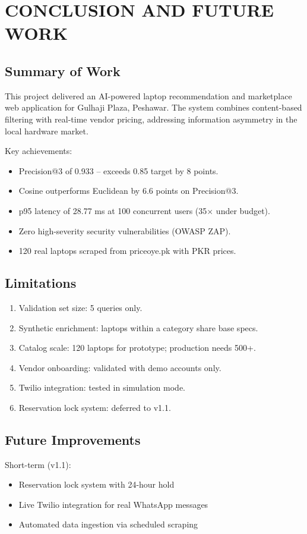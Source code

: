 \chapter{CONCLUSION AND FUTURE WORK}

\section{Summary of Work}
This project delivered an AI-powered laptop recommendation and marketplace web
application for Gulhaji Plaza, Peshawar. The system combines content-based
filtering with real-time vendor pricing, addressing information asymmetry in
the local hardware market.

Key achievements:
\begin{itemize}
  \item Precision@3 of 0.933 -- exceeds 0.85 target by 8 points.
  \item Cosine outperforms Euclidean by 6.6 points on Precision@3.
  \item p95 latency of 28.77 ms at 100 concurrent users (35$\times$ under budget).
  \item Zero high-severity security vulnerabilities (OWASP ZAP).
  \item 120 real laptops scraped from priceoye.pk with PKR prices.
\end{itemize}

\section{Limitations}
\begin{enumerate}
  \item Validation set size: 5 queries only.
  \item Synthetic enrichment: laptops within a category share base specs.
  \item Catalog scale: 120 laptops for prototype; production needs 500+.
  \item Vendor onboarding: validated with demo accounts only.
  \item Twilio integration: tested in simulation mode.
  \item Reservation lock system: deferred to v1.1.
\end{enumerate}

\section{Future Improvements}
Short-term (v1.1):
\begin{itemize}
  \item Reservation lock system with 24-hour hold
  \item Live Twilio integration for real WhatsApp messages
  \item Automated data ingestion via scheduled scraping
\end{itemize}

